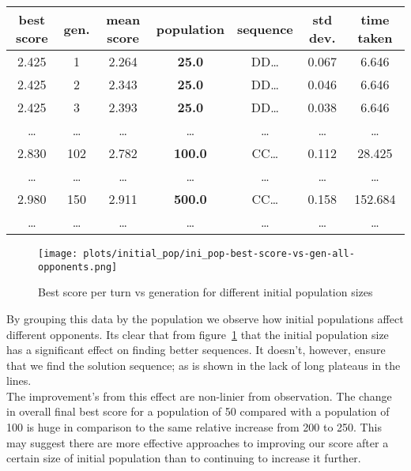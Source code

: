 \begin{center}
    \begin{tabular}{|c|c|c|c|c|c|c|} 
        \hline
        best score & gen. & mean score & population & sequence & std dev. & time taken \\
        \hline
        2.425 & 1 & 2.264 & \textbf{25.0} & DD\ldots & 0.067 & 6.646\\
        2.425 & 2 & 2.343 & \textbf{25.0} & DD\ldots & 0.046 & 6.646\\
        2.425 & 3 & 2.393 & \textbf{25.0} & DD\ldots & 0.038 & 6.646\\
        \ldots  & \ldots  & \ldots  & \ldots  & \ldots  & \ldots  & \ldots \\
        2.830 & 102 & 2.782 & \textbf{100.0} & CC\ldots & 0.112 & 28.425\\
        \ldots  & \ldots  & \ldots  & \ldots  & \ldots  & \ldots  & \ldots \\
        2.980 & 150 & 2.911 & \textbf{500.0} & CC\ldots & 0.158 & 152.684\\
        \ldots  & \ldots  & \ldots  & \ldots  & \ldots  & \ldots  & \ldots \\
        \hline
        \end{tabular}
\end{center}


\begin{figure}
    \texttt{[image: plots/initial\_pop/ini\_pop-best-score-vs-gen-all-opponents.png]}
    \caption{Best score per turn vs generation for different initial population sizes}
    \label{fig:ini_pop-best-score-vs-gen-all-opponents}   
\end{figure}

By grouping this data by the population we observe how initial populations affect different opponents. 
Its clear that from figure~\ref{fig:ini_pop-best-score-vs-gen-all-opponents} that the initial population size has a significant effect on finding better sequences.
It doesn't, however, ensure that we find the solution sequence; as is shown in the lack of long plateaus in the lines.\\

The improvement's from this effect are non-linier from observation.
The change in overall final best score for a population of 50 compared with a population of 100 is huge in comparison to the same relative increase from 200 to 250.
This may suggest there are more effective approaches to improving our score after a certain size of initial population than to continuing to increase it further. \\

